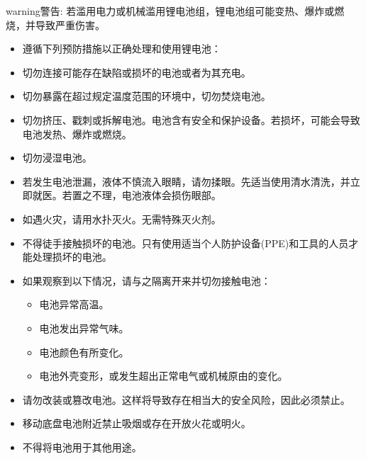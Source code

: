 \documentclass[a4paper,11pt,english,openany,oneside]{sphinxmanual}
\begin{document}
\begin{sphinxadmonition}{warning}{警告:}
\sphinxAtStartPar
若滥用电力或机械滥用锂电池组，锂电池组可能变热、爆炸或燃烧，并导致严重伤害。
\begin{itemize}
\item {} 
\sphinxAtStartPar
遵循下列预防措施以正确处理和使用锂电池：

\item {} 
\sphinxAtStartPar
切勿连接可能存在缺陷或损坏的电池或者为其充电。

\item {} 
\sphinxAtStartPar
切勿暴露在超过规定温度范围的环境中，切勿焚烧电池。

\item {} 
\sphinxAtStartPar
切勿挤压、戳刺或拆解电池。电池含有安全和保护设备。若损坏，可能会导致电池发热、爆炸或燃烧。

\item {} 
\sphinxAtStartPar
切勿浸湿电池。

\item {} 
\sphinxAtStartPar
若发生电池泄漏，液体不慎流入眼睛，请勿揉眼。先适当使用清水清洗，并立即就医。若置之不理，电池液体会损伤眼部。

\item {} 
\sphinxAtStartPar
如遇火灾，请用水扑灭火。无需特殊灭火剂。

\item {} 
\sphinxAtStartPar
不得徒手接触损坏的电池。只有使用适当个人防护设备(PPE)和工具的人员才能处理损坏的电池。

\item {} 
\sphinxAtStartPar
如果观察到以下情况，请与之隔离开来并切勿接触电池：
\begin{itemize}
\item {} 
\sphinxAtStartPar
电池异常高温。

\item {} 
\sphinxAtStartPar
电池发出异常气味。

\item {} 
\sphinxAtStartPar
电池颜色有所变化。

\item {} 
\sphinxAtStartPar
电池外壳变形，或发生超出正常电气或机械原由的变化。

\end{itemize}

\item {} 
\sphinxAtStartPar
请勿改装或篡改电池。这样将导致存在相当大的安全风险，因此必须禁止。

\item {} 
\sphinxAtStartPar
移动底盘电池附近禁止吸烟或存在开放火花或明火。

\item {} 
\sphinxAtStartPar
不得将电池用于其他用途。

\end{itemize}
\end{sphinxadmonition}
\end{document}
